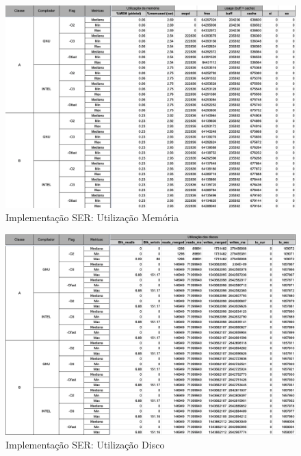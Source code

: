 \documentclass{article}
\begin{document}
\begin{appendices}
\begin{figure}[H]
    \centering
    \includegraphics[width=12cm]{Pictures/LUMZ_r641_SER_MEM.png}
    \caption{Implementação SER: Utilização Memória}
    \label{figure:LUMZ_r641_SER_MEM}
\end{figure}

\begin{figure}[H]
    \centering
    \includegraphics[width=12cm]{Pictures/LUMZ_r641_SER_DISK.png}
    \caption{Implementação SER: Utilização Disco}
    \label{figure:LUMZ_r641_SER_DISK}
\end{figure}


\end{appendices}
\end{document}
